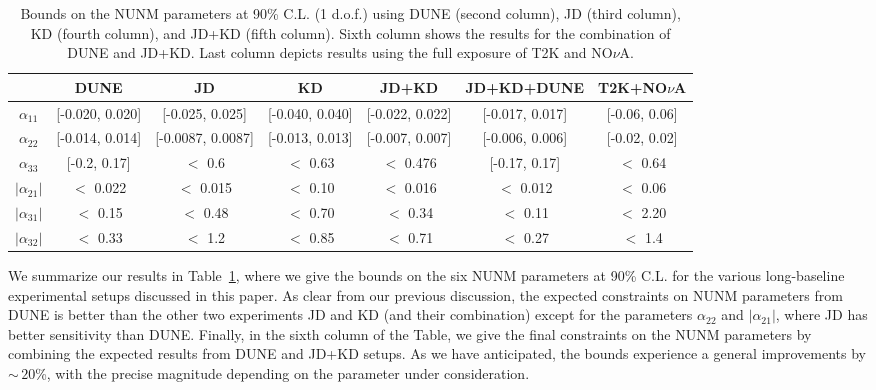 \documentclass[11pt,a4paper]{article}
\newcommand{\ame}{\ensuremath{\alpha_{21}}}
\newcommand{\amm}{\ensuremath{\alpha_{22}}}
\newcommand{\capdef}{}
\newcommand{\mycaption}[2][\capdef]{\renewcommand{\capdef}{#2}
	\caption[#1]{{\footnotesize #2}}}
\begin{document}
\begin{table}[thb!]
\begin{center}
 \begin{adjustbox}{width=\textwidth}
 \begin{tabular}{|c|c|c|c|c|c|c|}
\hline\hline
&DUNE&JD&KD&JD+KD&JD+KD+DUNE&T2K+NO$\nu$A\\ 
\hline
$\alpha_{11}$ & [-0.020, 0.020] &[-0.025, 0.025]&[-0.040, 0.040]&   [-0.022, 0.022] & [-0.017, 0.017]& [-0.06, 0.06]\\
\hline
$\alpha_{22}$& [-0.014, 0.014]& [-0.0087, 0.0087]&[-0.013, 0.013]& [-0.007, 0.007] & [-0.006, 0.006] & [-0.02, 0.02]\\
\hline
$\alpha_{33}$& [-0.2, 0.17] & $<$ 0.6 & $<$ 0.63 & $<$ 0.476  & [-0.17, 0.17]& $<$ 0.64\\
\hline
$|\alpha_{21}|$ &  $<$ 0.022 & $<$ 0.015 & $<$ 0.10  & $<$ 0.016 & $<$ 0.012 & $<$ 0.06\\ 
\hline
$|\alpha_{31}|$& $<$ 0.15  & $<$ 0.48 & $<$ 0.70 & $<$ 0.34 &$<$ 0.11 & $<$ 2.20\\
\hline
$|\alpha_{32}|$& $<$ 0.33 & $<$ 1.2 & $<$ 0.85 & $<$ 0.71& $<$ 0.27 & $<$ 1.4\\
\hline\hline
\end{tabular}
 \end{adjustbox}
\mycaption{Bounds on the NUNM parameters at 90\% C.L. (1 d.o.f.) using DUNE (second column), JD (third column), KD (fourth column), and JD+KD (fifth column). Sixth column shows the results for the combination of DUNE and JD+KD. Last column depicts results using the full exposure of T2K and NO$\nu$A.}
\label{Tab:constraints}
\end{center}
\end{table}


We summarize our results in Table~\ref{Tab:constraints}, where we give the bounds on the six NUNM parameters at 90\% C.L. for the various long-baseline  experimental setups discussed in this paper. As clear from our previous discussion,  the expected constraints on NUNM parameters from DUNE is better than the other two experiments JD and KD (and their combination) except for the parameters $\amm$ and $|\ame|$, where JD has better sensitivity than DUNE.
Finally, in the sixth column of the Table, we give the final constraints on the NUNM parameters by combining the expected results from  DUNE and JD+KD setups. As we have anticipated, the bounds experience a general improvements by $\sim\,20$\%, with the precise magnitude depending on the parameter under consideration.
\end{document}
